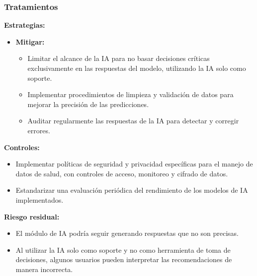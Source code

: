 \documentclass[a4paper,12pt]{article}
\begin{document}
    \subsubsection{Tratamientos}
    \par \textbf{Estrategias:}
    \begin{itemize}
        \item \textbf{Mitigar:}
        \begin{itemize}
            \item Limitar el alcance de la IA para no basar decisiones críticas exclusivamente en las respuestas del modelo, utilizando la IA solo como soporte.
            \item Implementar procedimientos de limpieza y validación de datos para mejorar la precisión de las predicciones.
            \item Auditar regularmente las respuestas de la IA para detectar y corregir errores.
        \end{itemize} 
    \end{itemize}
    \par \textbf{Controles:}
    \begin{itemize}
        \item Implementar políticas de seguridad y privacidad específicas para el manejo de datos de salud, con controles de acceso, monitoreo y cifrado de datos.
        \item Estandarizar una evaluación periódica del rendimiento de los modelos de IA implementados.
    \end{itemize}
    \par \textbf{Riesgo residual:}
    \begin{itemize}
        \item El módulo de IA podría seguir generando respuestas que no son precisas.
        \item Al utilizar la IA solo como soporte y no como herramienta de toma de decisiones, algunos usuarios pueden interpretar las recomendaciones de manera incorrecta.
    \end{itemize}
\end{document}
